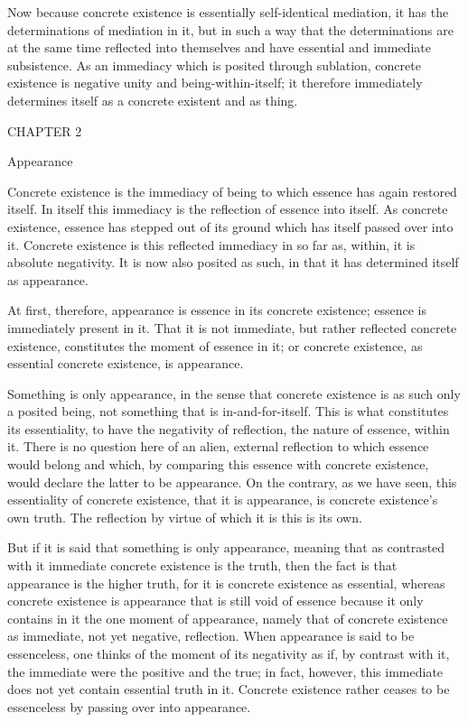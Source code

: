 Now because concrete existence is
essentially self-identical mediation,
it has the determinations of mediation in it,
but in such a way that the determinations are
at the same time reflected into themselves
and have essential and immediate subsistence.
As an immediacy which is posited through sublation,
concrete existence is negative unity and being-within-itself;
it therefore immediately determines itself
as a concrete existent and as thing.

CHAPTER 2

Appearance

Concrete existence is the immediacy of being
to which essence has again restored itself.
In itself this immediacy is the reflection of essence into itself.
As concrete existence, essence has stepped out of its ground
which has itself passed over into it.
Concrete existence is this reflected immediacy
in so far as, within, it is absolute negativity.
It is now also posited as such,
in that it has determined itself as appearance.

At first, therefore, appearance is
essence in its concrete existence;
essence is immediately present in it.
That it is not immediate,
but rather reflected concrete existence,
constitutes the moment of essence in it;
or concrete existence, as essential concrete existence,
is appearance.

Something is only appearance,
in the sense that concrete existence is
as such only a posited being,
not something that is in-and-for-itself.
This is what constitutes its essentiality,
to have the negativity of reflection,
the nature of essence, within it.
There is no question here of an alien,
external reflection to which essence would belong
and which, by comparing this essence with concrete existence,
would declare the latter to be appearance.
On the contrary, as we have seen,
this essentiality of concrete existence,
that it is appearance, is
concrete existence's own truth.
The reflection by virtue of which
it is this is its own.

But if it is said that something is only appearance,
meaning that as contrasted with it
immediate concrete existence is the truth,
then the fact is that appearance is the higher truth,
for it is concrete existence as essential,
whereas concrete existence is appearance
that is still void of essence
because it only contains in it
the one moment of appearance,
namely that of concrete existence
as immediate, not yet negative, reflection.
When appearance is said to be essenceless,
one thinks of the moment of its negativity as if,
by contrast with it, the immediate were
the positive and the true;
in fact, however, this immediate does not
yet contain essential truth in it.
Concrete existence rather ceases to be essenceless
by passing over into appearance.

